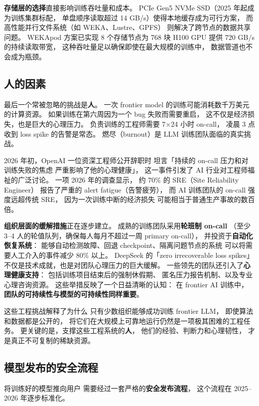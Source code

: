 \textbf{存储层的选择}直接影响训练吞吐量和成本。
PCIe Gen5 NVMe SSD（2025 年起成为训练集群标配，
单盘顺序读取超过 14 GB/s）使得本地缓存成为可行方案，
而高性能并行文件系统（如 WEKA、Lustre、GPFS）
则解决了跨节点的数据共享问题。
WEKApod 方案已实现 8 个存储节点为 768 块 H100 GPU
提供 720 GB/s 的持续读取带宽，
这种吞吐量足以确保即使在最大规模的训练中，
数据管道也不会成为瓶颈。

\subsection{人的因素}

最后一个常被忽略的挑战是\textbf{人}。
一次 frontier model 的训练可能消耗数千万美元的计算资源。
如果训练在第六周因为一个 bug 失败而需要重启，
这不仅是经济损失，也是巨大的心理压力。
负责训练的工程师需要 7$\times$24 小时 on-call，
凌晨 3 点收到 loss spike 的告警是常态。
燃尽（burnout）是 LLM 训练团队面临的真实挑战。

2026 年初，OpenAI 一位资深工程师公开辞职时
坦言「持续的 on-call 压力和对训练失败的焦虑
严重影响了他的心理健康」，
这一事件引发了 AI 行业对工程师福祉的广泛讨论。
一项 2026 年的调查显示，
约 70\% 的 SRE（Site Reliability Engineer）
报告了严重的 alert fatigue（告警疲劳），
而 AI 训练团队的 on-call 强度远超传统 SRE，
因为一次训练中断的经济损失
可能相当于普通生产事故的数百倍。

\textbf{组织层面的缓解措施}正在逐步建立。
成熟的训练团队采用\textbf{轮班制 on-call}
（至少 3--4 人的轮值队列，确保每人每月不超过一周 primary on-call），
并投资于\textbf{自动化恢复系统}：
能够自动检测故障、回退 checkpoint、隔离问题节点的系统
可以将需要人工介入的事件减少 80\% 以上。
DeepSeek 的「zero irrecoverable loss spikes」
不仅是技术成就，也是对团队心理压力的巨大缓解。
一些领先的团队还引入了\textbf{心理健康支持}：
包括训练项目结束后的强制休假期、
匿名压力报告机制、以及专业心理咨询资源。
这些举措反映了一个日益清晰的认知：
在 frontier AI 训练中，
\textbf{团队的可持续性与模型的可持续性同样重要}。

这些工程挑战解释了为什么
只有少数组织能够成功训练 frontier LLM，
即使算法和数据都是公开的，
将它们在大规模上可靠地运行仍然是一项极其困难的工程任务。
更关键的是，支撑这些工程系统的\textbf{人}，
他们的经验、判断力和心理韧性，
才是真正不可复制的稀缺资源。

\subsection{模型发布的安全流程}

将训练好的模型推向用户
需要经过一套严格的\textbf{安全发布流程}，
这个流程在 2025--2026 年逐步标准化。

